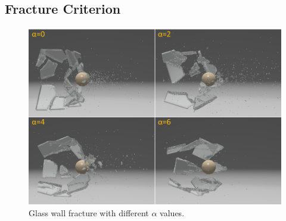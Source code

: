 \subsection{Fracture Criterion}
\begin{figure}[t]
  \centering
  \includegraphics[width=\linewidth]{../figs/revision/demo_shatter_control.png}
  \caption{\label{fig:7_after}
  Glass wall fracture with different $\alpha$ values.
}
\end{figure}

